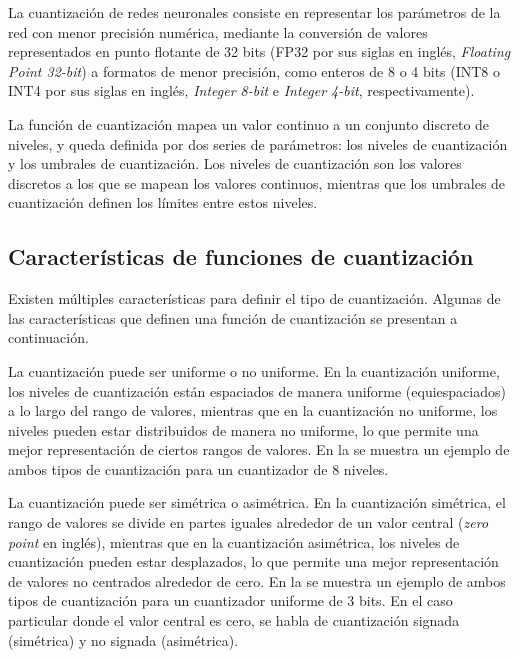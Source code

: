 La cuantización de redes neuronales consiste en representar los parámetros de la red con menor precisión numérica, mediante la conversión de valores representados en punto flotante de 32 bits (FP32 por sus siglas en inglés, \textit{Floating Point 32-bit}) a formatos de menor precisión, como enteros de 8 o 4 bits (INT8 o INT4 por sus siglas en inglés, \textit{Integer 8-bit} e \textit{Integer 4-bit}, respectivamente).

La función de cuantización mapea un valor continuo a un conjunto discreto de niveles, y queda definida por dos series de parámetros: los niveles de cuantización y los umbrales de cuantización. Los niveles de cuantización son los valores discretos a los que se mapean los valores continuos, mientras que los umbrales de cuantización definen los límites entre estos niveles.

\subsection{Características de funciones de cuantización}

Existen múltiples características para definir el tipo de cuantización. Algunas de las características que definen una función de cuantización se presentan a continuación.

La cuantización puede ser uniforme o no uniforme. En la cuantización uniforme, los niveles de cuantización están espaciados de manera uniforme (equiespaciados) a lo largo del rango de valores, mientras que en la cuantización no uniforme, los niveles pueden estar distribuidos de manera no uniforme, lo que permite una mejor representación de ciertos rangos de valores. En la  se muestra un ejemplo de ambos tipos de cuantización para un cuantizador de 8 niveles.


La cuantización puede ser simétrica o asimétrica. En la cuantización simétrica, el rango de valores se divide en partes iguales alrededor de un valor central (\textit{zero point} en inglés), mientras que en la cuantización asimétrica, los niveles de cuantización pueden estar desplazados, lo que permite una mejor representación de valores no centrados alrededor de cero. En la  se muestra un ejemplo de ambos tipos de cuantización para un cuantizador uniforme de 3 bits. En el caso particular donde el valor central es cero, se habla de cuantización signada (simétrica) y no signada (asimétrica).

